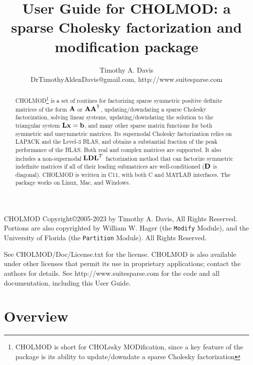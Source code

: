 \documentclass[11pt]{article}
\newcommand{\m}[1]{{\bf{#1}}}       %
\newcommand{\tr}{^{\sf T}}          %
\begin{document}
\author{Timothy A. Davis \\
DrTimothyAldenDavis@gmail.com, http://www.suitesparse.com }
\title{User Guide for CHOLMOD: a sparse Cholesky factorization and
modification package}


\maketitle

\begin{abstract}
    CHOLMOD\footnote{CHOLMOD is short for CHOLesky MODification, since a key
    feature of the package is its ability to update/downdate a sparse Cholesky
    factorization} is a set of routines for factorizing sparse symmetric
    positive definite matrices of the form $\m{A}$ or $\m{AA}\tr$,
    updating/downdating a sparse Cholesky factorization, solving linear
    systems, updating/downdating the solution to the triangular system
    $\m{Lx}=\m{b}$, and many other sparse matrix functions for both symmetric
    and unsymmetric matrices.  Its supernodal Cholesky factorization relies on
    LAPACK and the Level-3 BLAS, and obtains a substantial fraction of the peak
    performance of the BLAS.  Both real and complex matrices are supported.  It
    also includes a non-supernodal $\m{LDL}^T$ factorization method that can
    factorize symmetric indefinite matrices if all of their leading submatrices
    are well-conditioned ($\m{D}$ is diagonal).  CHOLMOD is written in C11,
    with both C and MATLAB interfaces.  The package works on Linux, Mac, and
    Windows.
\end{abstract}

CHOLMOD Copyright\copyright 2005-2023 by Timothy A. Davis, All Rights Reserved.
Portions are also copyrighted by William W. Hager (the {\tt Modify} Module),
and the University of Florida (the {\tt Partition} Module).
All Rights Reserved.

See CHOLMOD/Doc/License.txt for the license.
CHOLMOD is also available under other licenses that permit its use in
proprietary applications; contact the authors for details.
See http://www.suitesparse.com for the code and all documentation,
including this User Guide.

\newpage
\tableofcontents

\newpage \section{Overview}
\end{document}
